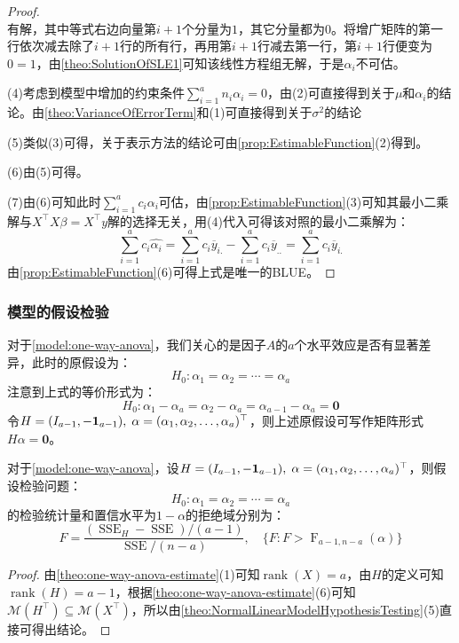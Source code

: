 \begin{proof}
\begin{equation*}
	\end{equation*}
	有解，其中等式右边向量第$i+1$个分量为$1$，其它分量都为$0$。将增广矩阵的第一行依次减去除了$i+1$行的所有行，再用第$i+1$行减去第一行，第$i+1$行便变为$0=1$，由\cref{theo:SolutionOfSLE1}可知该线性方程组无解，于是$\alpha_i$不可估。\par
	(4)考虑到模型中增加的约束条件$\sum\limits_{i=1}^{a}n_i\alpha_i=0$，由(2)可直接得到关于$\mu$和$\alpha_i$的结论。由\cref{theo:VarianceOfErrorTerm}和(1)可直接得到关于$\sigma^2$的结论\par
	(5)类似(3)可得，关于表示方法的结论可由\cref{prop:EstimableFunction}(2)得到。\par
	(6)由(5)可得。\par
	(7)由(6)可知此时$\sum\limits_{i=1}^{a}c_i\alpha_i$可估，由\cref{prop:EstimableFunction}(3)可知其最小二乘解与$X^{\top}X\beta=X^{\top}y$解的选择无关，用(4)代入可得该对照的最小二乘解为：
	\begin{equation*}
		\sum_{i=1}^{a}c_i\hat{\alpha_i}=\sum_{i=1}^{a}c_i\overline{y}_{i.}-\sum_{i=1}^{a}c_i\overline{y}_{..}=\sum_{i=1}^{a}c_i\overline{y}_{i.}
	\end{equation*}
	由\cref{prop:EstimableFunction}(6)可得上式是唯一的BLUE。
\end{proof}

\subsubsection{模型的假设检验}
\begin{note}
	对于\cref{model:one-way-anova}，我们关心的是因子$A$的$a$个水平效应是否有显著差异，此时的原假设为：
	\begin{equation*}
		H_0:\alpha_1=\alpha_2=\cdots=\alpha_a
	\end{equation*}
	注意到上式的等价形式为：
	\begin{equation*}
		H_0:\alpha_1-\alpha_a=\alpha_2-\alpha_a=\alpha_{a-1}-\alpha_a=\mathbf{0}
	\end{equation*}
	令$H=(I_{a-1},-\mathbf{1}_{a-1}),\;\alpha=(\alpha_1, \alpha_2, \dots, \alpha_{a})^{\top}$，则上述原假设可写作矩阵形式$H\alpha=\mathbf{0}$。
\end{note}
\begin{theorem}\label{theo:AOVHypothesisTesting}
	对于\cref{model:one-way-anova}，设$H=(I_{a-1},-\mathbf{1}_{a-1}),\;\alpha=(\alpha_1, \alpha_2, \dots, \alpha_{a})^{\top}$，则假设检验问题：
	\begin{equation*}
		H_0:\alpha_1=\alpha_2=\cdots=\alpha_a
	\end{equation*}
	的检验统计量和置信水平为$1-\alpha$的拒绝域分别为：
	\begin{equation*}
		F=\frac{(\operatorname{SSE}_H-\operatorname{SSE})/(a-1)}{\operatorname{SSE}/(n-a)},\quad\{F:F>\operatorname{F}_{a-1,n-a}(\alpha)\}
	\end{equation*}
\end{theorem}
\begin{proof}
	由\cref{theo:one-way-anova-estimate}(1)可知$\operatorname{rank}(X)=a$，由$H$的定义可知$\operatorname{rank}(H)=a-1$，根据\cref{theo:one-way-anova-estimate}(6)可知$\mathcal{M}(H^{\top})\subseteq\mathcal{M}(X^{\top})$，所以由\cref{theo:NormalLinearModelHypothesisTesting}(5)直接可得出结论。
\end{proof}
